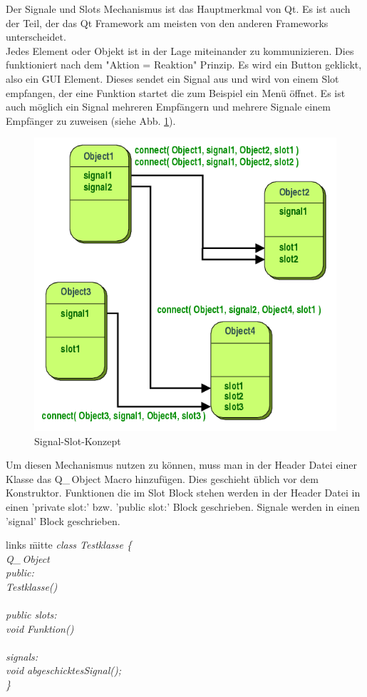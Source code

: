 Der Signale und Slots Mechanismus ist das Hauptmerkmal von Qt. Es ist auch der Teil, der das Qt Framework am meisten von den anderen Frameworks unterscheidet. \cite{QtSAS} \\
Jedes Element oder Objekt ist in der Lage miteinander zu kommunizieren. Dies funktioniert nach dem "Aktion = Reaktion" Prinzip. Es wird ein Button geklickt, also ein \ac{GUI} Element. Dieses sendet ein Signal aus und wird von einem Slot empfangen, der eine Funktion startet die zum Beispiel ein Menü öffnet.
Es ist auch möglich ein Signal mehreren Empfängern und mehrere Signale einem Empfänger zu zuweisen (siehe Abb. \ref{fig:SignaleAndSlots}).
\begin{figure}[H]
\centering
\includegraphics[width=0.7\linewidth]{images/SignaleAndSlots}
\caption[Signal-Slot-Konzept]{Signal-Slot-Konzept \cite[Web]{QtPic1}}
\label{fig:SignaleAndSlots}
\end{figure}
Um diesen Mechanismus nutzen zu können, muss man in der Header Datei einer Klasse das Q\_\,Object Macro hinzufügen. Dies geschieht üblich vor dem Konstruktor. Funktionen die im Slot Block stehen werden in der Header Datei in einen 'private slot:' bzw. 'public slot:' Block geschrieben. Signale werden in einen 'signal' Block geschrieben.
\begin{tabbing}
links \= mitte \kill
\emph{class Testklasse \{ } \\
\> \emph{Q\_\,Object  }\\
\emph{public: }\\
\> \emph{Testklasse() {} }\\ \\
\emph{public slots: }\\
\> \emph{void Funktion() }\\ \\
\emph{signals: }\\
\> \emph{void abgeschicktesSignal(); }\\
\emph{ 		\} }
\end{tabbing}

